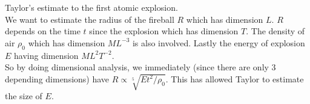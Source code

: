 \begin{example}
    Taylor's estimate to the first atomic explosion.\\
    We want to estimate the radius of the fireball $R$ which has dimension $L$.
    $R$ depends on the time $t$ since the explosion which has dimension $T$.
    The density of air $\rho_0$ which has dimension $ML^{-3}$ is also involved.
    Lastly the energy of explosion $E$ having dimension $ML^2T^{-2}$.\\
    So by doing dimensional analysis, we immediately (since there are only $3$ depending dimensions) have $R\propto \sqrt[5]{Et^2/\rho_0}$.
    This has allowed Taylor to estimate the size of $E$.
\end{example}